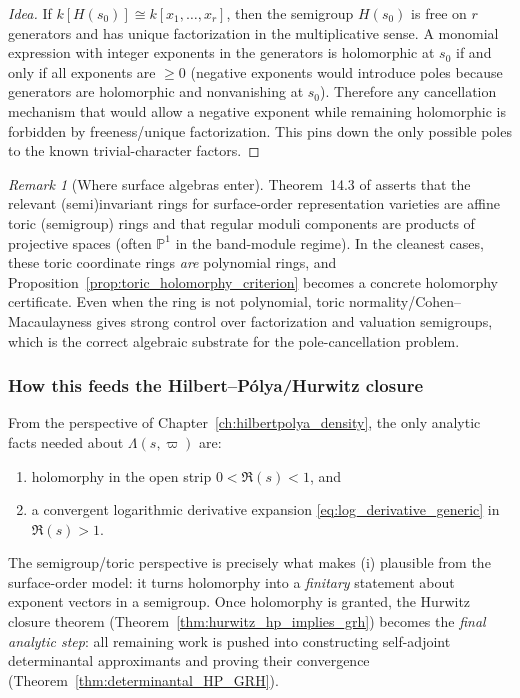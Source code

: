 \documentclass[11pt,oneside]{amsbook}
\numberwithin{equation}{section}
\theoremstyle{plain}
\theoremstyle{definition}
\theoremstyle{remark}
\newtheorem{remark}[theorem]{Remark}
\begin{document}
\begin{proof}[Idea]
If $k[H(s_0)]\cong k[x_1,\dots,x_r]$, then the semigroup $H(s_0)$ is free on $r$ generators and has unique factorization in the multiplicative sense.
A monomial expression with integer exponents in the generators is holomorphic at $s_0$ if and only if all exponents are $\ge 0$ (negative exponents would introduce poles because generators are holomorphic and nonvanishing at $s_0$).
Therefore any cancellation mechanism that would allow a negative exponent while remaining holomorphic is forbidden by freeness/unique factorization.
This pins down the only possible poles to the known trivial-character factors.
\end{proof}

\begin{remark}[Where surface algebras enter]
Theorem~14.3 of \cite{Schreiber2018SurfaceAlgebrasI} asserts that the relevant (semi)invariant rings for surface-order representation varieties are affine toric (semigroup) rings and that regular moduli components are products of projective spaces (often $\mathbb{P}^1$ in the band-module regime).
In the cleanest cases, these toric coordinate rings \emph{are} polynomial rings, and Proposition~\ref{prop:toric_holomorphy_criterion} becomes a concrete holomorphy certificate.
Even when the ring is not polynomial, toric normality/Cohen--Macaulayness gives strong control over factorization and valuation semigroups, which is the correct algebraic substrate for the pole-cancellation problem.
\end{remark}

\subsubsection{How this feeds the Hilbert--Pólya/Hurwitz closure}
From the perspective of Chapter~\ref{ch:hilbertpolya_density}, the only analytic facts needed about $\Lambda(s,\varpi)$ are:
\begin{enumerate}[label=(\roman*)]
\item holomorphy in the open strip $0<\Re(s)<1$, and
\item a convergent logarithmic derivative expansion \eqref{eq:log_derivative_generic} in $\Re(s)>1$.
\end{enumerate}
The semigroup/toric perspective is precisely what makes (i) plausible from the surface-order model:
it turns holomorphy into a \emph{finitary} statement about exponent vectors in a semigroup.
Once holomorphy is granted, the Hurwitz closure theorem (Theorem~\ref{thm:hurwitz_hp_implies_grh}) becomes the \emph{final analytic step}:
all remaining work is pushed into constructing self-adjoint determinantal approximants and proving their convergence (Theorem~\ref{thm:determinantal_HP_GRH}).
\end{document}

